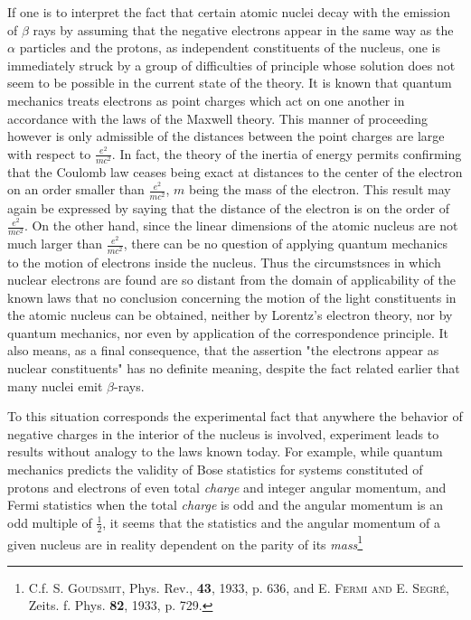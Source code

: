 \documentclass[a4paper,11pt]{article}
\newcommand{\?}[2]{#1\footnote{\textsc{Translator note}: #2}}
\newcommand{\citeauthor}[1]{\textsc{#1}}
\newcommand{\citepub}[1]{#1}
\newcommand{\citevol}[1]{\textbf{#1}}
\newcommand{\citepage}[1]{#1}
\newcommand{\citeyear}[1]{#1}
\begin{document}
If one is to interpret the fact that certain atomic nuclei decay with the emission of $\beta$ rays by assuming that the negative electrons appear in the same way as the $\alpha$ particles and the protons, as independent constituents of the nucleus, one is immediately struck by a group of difficulties of principle whose solution does not seem to be possible in the current state of the theory. It is known that quantum mechanics treats electrons as point charges which act on one another in accordance with the laws of the Maxwell theory. This manner of proceeding however is only admissible of the distances between the point charges are large with respect to $\frac{e^2}{mc^2}$. In fact, the theory of the inertia of energy permits confirming that the Coulomb law ceases being exact at distances to the center of the electron on an order smaller than $\frac{e^2}{mc^2}$, $m$ being the mass of the electron. This result may again be expressed by saying that the distance of the electron is on the order of $\frac{e^2}{mc^2}$. On the other hand, since the linear dimensions of the atomic nucleus are not much larger than $\frac{e^2}{mc^2}$, there can be no question of applying quantum mechanics to the motion of electrons inside the nucleus. Thus the circumstsnces in which nuclear electrons are found are so distant from the domain of applicability of the known laws that no conclusion concerning the motion of the light constituents in the atomic nucleus can be obtained, neither by Lorentz's electron theory, nor by quantum mechanics, nor even by application of the correspondence principle. It also means, as a final consequence, that the assertion "the electrons appear as nuclear constituents" has no definite meaning, despite the fact related earlier that many nuclei emit $\beta$-rays. 

To this situation corresponds the experimental fact that anywhere the behavior of negative charges in the interior of the nucleus is involved, experiment leads to results without analogy to the laws known today. For example, while quantum mechanics predicts the validity of Bose statistics for systems constituted of protons and electrons of even total \textit{charge} and integer angular momentum, and Fermi statistics when the total \textit{charge} is odd and the angular momentum is an odd multiple of $\frac{1}{2}$, it seems that the statistics and the angular momentum of a given nucleus are in reality dependent on the parity of its \textit{mass}\footnote{C.f. \citeauthor{S. Goudsmit}, \citepub{Phys. Rev.}, \citevol{43}, \citeyear{1933}, \citepage{p. 636}, and \citeauthor{E. Fermi and E. Segré}, \citepub{Zeits. f. Phys.} \citevol{82}, \citeyear{1933}, \citepage{p. 729}.}
\end{document}
